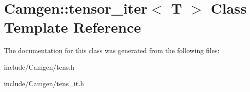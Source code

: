 \hypertarget{a00528}{\section{Camgen\-:\-:tensor\-\_\-iter$<$ T $>$ Class Template Reference}
\label{a00528}
}


The documentation for this class was generated from the following files\-:\begin{DoxyCompactItemize}
\item 
include/\-Camgen/tens.\-h\item 
include/\-Camgen/tens\-\_\-it.\-h\end{DoxyCompactItemize}
